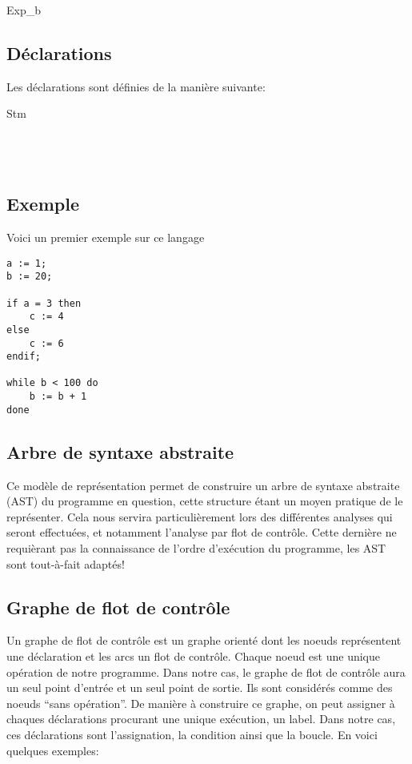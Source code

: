 \documentclass[a4paper, 12pt]{article}
\begin{document}
\begin{dtype}{Exp_b}
  \\
\end{dtype}

\subsection{Déclarations}
Les déclarations sont définies de la manière suivante:

\begin{dtype}{Stm}
  \\
  \\
  \akind{ }\\
  \\
\end{dtype}

\subsection{Exemple}
Voici un premier exemple sur ce langage
\begin{lstlisting}
a := 1;
b := 20;

if a = 3 then
	c := 4
else
	c := 6
endif;

while b < 100 do
	b := b + 1
done
\end{lstlisting}

\subsection{Arbre de syntaxe abstraite}
Ce modèle de représentation permet de construire un arbre de syntaxe abstraite (AST) du programme en question,
cette structure étant un moyen pratique de le représenter. Cela nous servira particulièrement lors des différentes
analyses qui seront effectuées, et notamment l'analyse par flot de contrôle. Cette dernière ne requièrant pas
la connaissance de l'ordre d'exécution du programme, les AST sont tout-à-fait adaptés!

\begin{center}\end{center}

\subsection{Graphe de flot de contrôle}
Un graphe de flot de contrôle est un graphe orienté dont les noeuds représentent une déclaration et les arcs un
flot de contrôle. Chaque noeud est une unique opération de notre programme. Dans notre cas, le graphe de flot de
contrôle aura un seul point d'entrée et un seul point de sortie. Ils sont considérés comme des noeuds ``sans opération''.
De manière à construire ce graphe, on peut assigner à chaques déclarations procurant une unique exécution, un label.
Dans notre cas, ces déclarations sont l'assignation, la condition ainsi que la boucle. En voici quelques exemples:
\end{document}
